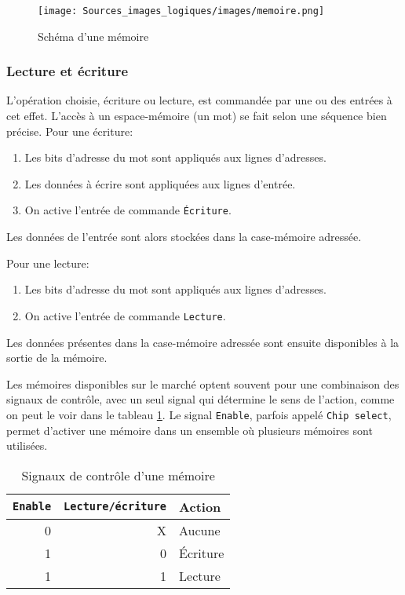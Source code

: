 \documentclass[11pt]{article}
\begin{document}
\begin{figure}[htbp]
\centering
\texttt{[image: Sources\_images\_logiques/images/memoire.png]}
\caption{\label{fig:orge1ec065}Schéma d'une mémoire}
\end{figure}

\subsubsection{Lecture et écriture}
\label{sec:orgfc252bd}

L'opération choisie, écriture ou lecture, est commandée par une ou des
entrées à cet effet. L'accès à un espace-mémoire (un mot) se fait
selon une séquence bien précise. Pour une écriture:

\begin{enumerate}
\item Les bits d'adresse du mot sont appliqués aux lignes d'adresses.
\item Les données à écrire sont appliquées aux lignes d'entrée.
\item On active l'entrée de commande \texttt{Écriture}.
\end{enumerate}

Les données de l'entrée sont alors stockées dans la case-mémoire adressée.

Pour une lecture:

\begin{enumerate}
\item Les bits d'adresse du mot sont appliqués aux lignes d'adresses.
\item On active l'entrée de commande \texttt{Lecture}.
\end{enumerate}

Les données présentes dans la case-mémoire adressée sont ensuite
disponibles à la sortie de la mémoire.

Les mémoires disponibles sur le marché optent souvent pour une
combinaison des signaux de contrôle, avec un seul signal qui détermine
le sens de l'action, comme on peut le voir dans le tableau
\ref{tab:org201b1e3}. Le signal \texttt{Enable}, parfois appelé \texttt{Chip
select}, permet d'activer une mémoire dans un ensemble où plusieurs
mémoires sont utilisées.

\begin{table}[htbp]
\caption{\label{tab:org201b1e3}Signaux de contrôle d'une mémoire}
\centering
\begin{tabular}{rrl}
\texttt{Enable} & \texttt{Lecture/écriture} & Action\\
\hline
0 & X & Aucune\\
1 & 0 & Écriture\\
1 & 1 & Lecture\\
\end{tabular}
\end{table}
\end{document}
